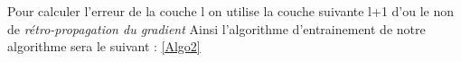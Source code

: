  Pour calculer l'erreur de la couche l on utilise la couche suivante l+1 d'ou le  non de \emph{rétro-propagation du gradient  }
 Ainsi l'algorithme d'entrainement de notre algorithme sera le suivant :
 \ref{Algo2}
